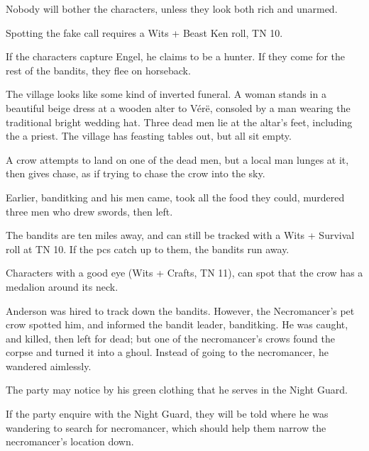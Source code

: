 \begin{multicols}{2}
Nobody will bother the characters, unless they look both rich and unarmed.

Spotting the fake call requires a Wits + Beast Ken roll, TN 10.

If the characters capture Engel, he claims to be a hunter.
If they come for the rest of the bandits, they flee on horseback.


\humansoldier


\begin{boxtext}

	The village looks like some kind of inverted funeral.  A woman stands in a beautiful beige dress at a wooden alter to V\'{e}r\"{e}, consoled by a man wearing the traditional bright wedding hat.  Three dead men lie at the altar's feet, including the a priest.  The village has feasting tables out, but all sit empty.

	A crow attempts to land on one of the dead men, but a local man lunges at it, then gives chase, as if trying to chase the crow into the sky.

\end{boxtext}

Earlier, \gls{banditking} and his men came, took all the food they could, murdered three men who drew swords, then left.

The bandits are ten miles away, and can still be tracked with a Wits + Survival roll at TN 10.
If the \glspl{pc} catch up to them, the bandits run away.

Characters with a good eye (Wits + Crafts, TN 11), can spot that the crow has a medalion around its neck.


Anderson was hired to track down the bandits.
However, the Necromancer's pet crow spotted him, and informed the bandit leader, \gls{banditking}.
He was caught, and killed, then left for dead; but one of the necromancer's crows found the corpse and turned it into a ghoul.
Instead of going to the necromancer, he wandered aimlessly.

The party may notice by his green clothing that he serves in the Night Guard.

\ghoul

If the party enquire with the Night Guard, they will be told where he was wandering to search for \gls{necromancer}, which should help them narrow the necromancer's location down.


\end{multicols}
